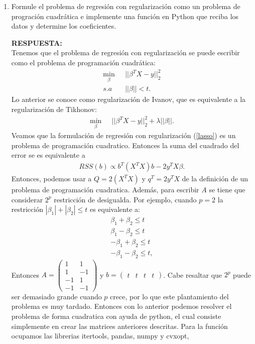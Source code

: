 \documentclass[11pt,letterpaper]{article}
\newcommand{\res}{\textbf{RESPUESTA:}\\}
\begin{document}
\begin{enumerate}
\item Formule el problema de regresión con regularización como un problema de progración cuadrática e implemente una función en Python que reciba los datos y determine los coeficientes.

\res Tenemos que el problema de regresión con regularización se puede escribir como el problema de programación cuadrática:
\begin{align}\label{lasso}
\min_{\beta} &\ \ \ ||\beta^T X-y||_2^2\\
s.a &\ \ \  ||\beta||<t.
\end{align}
Lo anterior se conoce como regularización de Ivanov, que es equivalente a la regularización de Tikhonov:
\begin{align*}
\min_{\beta} &\ \ \ ||\beta^T X-y||_2^2+\lambda ||\beta||.
\end{align*}
Veamos que la formulación de regresión con regularización (\ref{lasso}) es un problema de programación cuadratico. Entonces la suma del cuadrado del error se es equivalente a
\begin{align*}
RSS(b) \propto b^T(X^TX)b-2y^TX\beta.
\end{align*} 
Entonces, podemos usar a $Q=2(X^TX)$ y $q^T=2y^TX$ de la definición de un problema de programación cuadratica. Además, para escribir $A$ se tiene que considerar $2^p$ restricción de desigualda. Por ejemplo, cuando $p=2$ la restricción $|\beta_1|+|\beta_2|\leq t$ es equivalente a:
\begin{align*}
\beta_1+\beta_2\leq t\\
\beta_1-\beta_2\leq t\\
-\beta_1+\beta_2\leq t\\
-\beta_1-\beta_2\leq t,
\end{align*}  
Entonces $A = \begin{pmatrix}
1 &1\\
1 & -1\\
-1 & 1\\
-1 & -1
\end{pmatrix}$ y $b=\begin{pmatrix}
t & t & t & t
\end{pmatrix}$.
Cabe resaltar que $2^p$ puede ser demasiado grande cuando  $p$ crece, por lo que este plantamiento del problema es muy tardado. Entonces con lo anterior podemos resolver el problema de forma cuadratica con ayuda de python, el cual consiste simplemente en crear las matrices anteriores descritas. Para la función ocupamos las librerias \textsf{itertools, pandas, numpy} y \textsf{cvxopt},


\end{enumerate}
\end{document}
